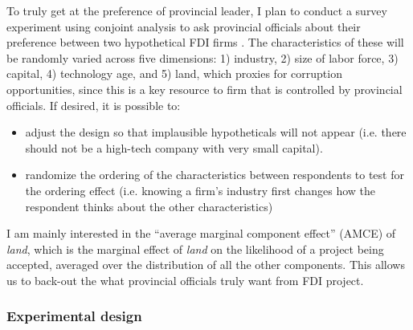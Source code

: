 \documentclass[12pt]{article}
\begin{document}
To truly get at the preference of provincial leader, I plan to conduct a survey experiment using conjoint analysis to ask provincial officials about their preference between two hypothetical FDI firms \citep{Hainmueller2014}. The characteristics of these will be randomly varied across five dimensions: 1) industry, 2) size of labor force, 3) capital, 4) technology age, and 5) land, which proxies for corruption opportunities, since this is a key resource to firm that is controlled by provincial officials. If desired, it is possible to:
\begin{itemize}
\item adjust the design so that implausible hypotheticals will not appear (i.e. there should not be a high-tech company with very small capital).
\item randomize the ordering of the characteristics between respondents to test for the ordering effect (i.e. knowing a firm's industry first changes how the respondent thinks about the other characteristics)
\end{itemize}

I am mainly interested in the ``average marginal component effect'' (AMCE) of \textit{land}, which is the marginal effect of \textit{land} on the likelihood of a project being accepted, averaged over the distribution of all the other components. This allows us to back-out the what provincial officials truly want from FDI project.

\subsubsection{Experimental design}


\clearpage


\end{document}
